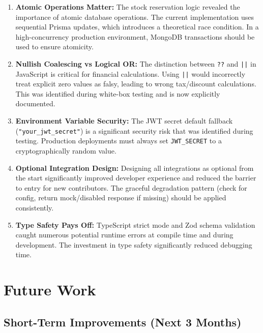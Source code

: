 \documentclass[12pt,a4paper]{report}
\begin{document}
\begin{enumerate}[leftmargin=1.5em]
  \item \textbf{Atomic Operations Matter:} The stock reservation logic revealed the importance of atomic database operations. The current implementation uses sequential Prisma updates, which introduces a theoretical race condition. In a high-concurrency production environment, MongoDB transactions should be used to ensure atomicity.
  \item \textbf{Nullish Coalescing vs Logical OR:} The distinction between \texttt{??} and \texttt{||} in JavaScript is critical for financial calculations. Using \texttt{||} would incorrectly treat explicit zero values as falsy, leading to wrong tax/discount calculations. This was identified during white-box testing and is now explicitly documented.
  \item \textbf{Environment Variable Security:} The JWT secret default fallback (\texttt{"your\_jwt\_secret"}) is a significant security risk that was identified during testing. Production deployments must always set \texttt{JWT\_SECRET} to a cryptographically random value.
  \item \textbf{Optional Integration Design:} Designing all integrations as optional from the start significantly improved developer experience and reduced the barrier to entry for new contributors. The graceful degradation pattern (check for config, return mock/disabled response if missing) should be applied consistently.
  \item \textbf{Type Safety Pays Off:} TypeScript strict mode and Zod schema validation caught numerous potential runtime errors at compile time and during development. The investment in type safety significantly reduced debugging time.
\end{enumerate}

\section{Future Work}

\subsection{Short-Term Improvements (Next 3 Months)}
\end{document}
